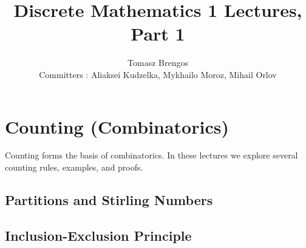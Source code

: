 \documentclass{article}
\title{Discrete Mathematics 1 Lectures, Part 1}
\author{Tomasz Brengos \\  
Committers : Aliaksei Kudzelka, Mykhailo Moroz, Mihail Orlov}
\date{}
\begin{document}
\maketitle

\section{Counting (Combinatorics)}

Counting forms the basis of combinatorics. In these lectures we explore several counting rules, examples, and proofs.
\begingroup
  \renewcommand{\section}{\subsection}
  
\endgroup

\section{Partitions and Stirling Numbers}
\begingroup
  \renewcommand{\section}{\subsection}
  
\endgroup

\section{Inclusion-Exclusion Principle}
\begingroup
  \let\maketitle\relax
  
\endgroup
\end{document}
